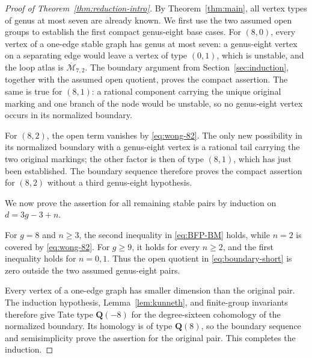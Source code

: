 \documentclass[12pt,reqno]{amsart}
\newcommand{\Q}{\mathbf{Q}}
\newcommand{\Mbar}{\overline{\mathcal{M}}}
\theoremstyle{definition}
\theoremstyle{remark}
\begin{document}
\begin{proof}[Proof of Theorem~\ref{thm:reduction-intro}]
By Theorem~\ref{thm:main}, all vertex types of genus at most seven are
already known.  We first use the two assumed open groups to establish the
first compact genus-eight base cases.  For $(8,0)$, every vertex of a one-edge
stable graph has genus at most seven: a genus-eight vertex on a separating
edge would leave a vertex of type $(0,1)$, which is unstable, and the loop
atlas is $\Mbar_{7,2}$.  The boundary argument from
Section~\ref{sec:induction}, together with the assumed open quotient, proves
the compact assertion.  The same is true for $(8,1)$: a rational component
carrying the unique original marking and one branch of the node would be
unstable, so no genus-eight vertex occurs in its normalized boundary.

For $(8,2)$, the open term vanishes by \eqref{eq:wong-82}.  The only new
possibility in its normalized boundary with a genus-eight vertex is a
rational tail carrying the two original markings; the other factor is then
of type $(8,1)$, which has just been established.  The boundary sequence
therefore proves the compact assertion for $(8,2)$ without a third
genus-eight hypothesis.

We now prove the assertion for all remaining stable pairs by induction on
$d=3g-3+n$.

For $g=8$ and $n\geq3$, the second inequality in \eqref{eq:BFP-BM} holds,
while $n=2$ is covered by \eqref{eq:wong-82}.
For $g\geq9$, it holds for every $n\geq2$, and the first inequality holds
for $n=0,1$.  Thus the open quotient in \eqref{eq:boundary-short} is zero
outside the two assumed genus-eight pairs.

Every vertex of a one-edge graph has smaller dimension than the original
pair.  The induction hypothesis, Lemma~\ref{lem:kunneth}, and finite-group
invariants therefore give Tate type $\Q(-8)$ for the degree-sixteen
cohomology of the normalized boundary.  Its homology is of type $\Q(8)$,
so the boundary sequence and semisimplicity prove the assertion for the
original pair.  This completes the induction.
\end{proof}
\end{document}
